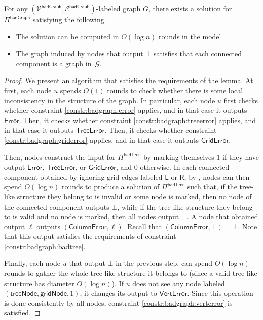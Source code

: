 \documentclass[11pt]{article}
\newcommand{\lleft}{\mathsf {L}}
\newcommand{\lright}{\mathsf {R}}
\newcommand{\lerror}{\mathsf {Error}}
\newcommand{\lgriderror}{\mathsf {GridError}}
\newcommand{\lverterror}{\mathsf {VertError}}
\newcommand{\ltreeerror}{\mathsf {TreeError}}
\newcommand{\lcolumnerror}{\mathsf {ColumnError}}
\newcommand{\lgridnode}{\mathsf {gridNode}}
\newcommand{\ltreenode}{\mathsf {treeNode}}
\newcommand{\lbadtree}{\mathsf {badTree}}
\newcommand{\lbadgraph}{\mathsf {badGraph}}
\begin{document}
\begin{lemma}\label{lem:solve-badgraph}
	For any $(\mathcal{V^\lbadgraph},\mathcal{E^\lbadgraph})$-labeled graph $G$, there exists a solution for $\Pi^{\lbadgraph}$ satisfying the following.
	\begin{itemize}[noitemsep]
		\item The solution can be computed in $O(\log n)$ rounds in the \local model.
		\item The graph induced by nodes that output $\bot$ satisfies that each connected component is a graph in~$\mathcal{G}$.
	\end{itemize}
\end{lemma}
\begin{proof}
	We present an algorithm that satisfies the requirements of the lemma.
	At first, each node $u$ spends $O(1)$ rounds to check whether there is some local inconsistency in the structure of the graph. In particular, each node $u$ first checks whether constraint \ref{constr:badgraph:error} applies, and in that case it outputs $\lerror$. Then, it checks whether constraint \ref{constr:badgraph:treeerror} applies, and in that case it outputs $\ltreeerror$. Then, it checks whether constraint \ref{constr:badgraph:griderror} applies, and in that case it outputs $\lgriderror$. 
	
	Then, nodes construct the input for $\Pi^{\lbadtree}$ by marking themselves $1$ if they have output $\lerror$, $\ltreeerror$, or $\lgriderror$, and $0$ otherwise. In each connected component obtained by ignoring grid edges labeled $\lleft$ or $\lright$, by , nodes can then spend $O(\log n)$ rounds to produce a solution of $\Pi^{\lbadtree}$ such that, if the tree-like structure they belong to is invalid or some node is marked, then no node of the connected component outputs $\bot$, while if the tree-like structure they belong to is valid and no node is marked, then all nodes output $\bot$. A node that obtained output $\ell$ outputs $(\lcolumnerror,\ell)$. Recall that $(\lcolumnerror,\bot) = \bot$. Note that this output satisfies the requirements of constraint \ref{constr:badgraph:badtree}.
	
	Finally, each node $u$ that output $\bot$ in the previous step, can spend $O(\log n)$ rounds to gather the whole tree-like structure it belongs to (since a valid tree-like structure has diameter $O(\log n)$). If $u$ does not see any node labeled $(\ltreenode,\lgridnode,1)$, it changes its output to $\lverterror$. Since this operation is done consistently by all nodes, constraint \ref{constr:badgraph:verterror} is satisfied. 
	

\end{proof}
\end{document}
